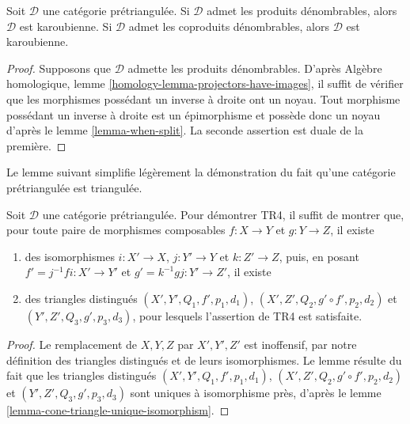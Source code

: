 \begin{lemma}
\label{lemma-projectors-have-images-triangulated}
Soit $\mathcal{D}$ une catégorie prétriangulée.
Si $\mathcal{D}$ admet les produits dénombrables, alors $\mathcal{D}$
est karoubienne.
Si $\mathcal{D}$ admet les coproduits dénombrables, alors $\mathcal{D}$
est karoubienne.
\end{lemma}

\begin{proof}
Supposons que $\mathcal{D}$ admette les produits dénombrables. D'après
Algèbre homologique, lemme \ref{homology-lemma-projectors-have-images},
il suffit de vérifier que les morphismes possédant un inverse à droite ont un
noyau. Tout morphisme possédant un inverse à droite est un épimorphisme et
possède donc un noyau d'après le lemme \ref{lemma-when-split}.
La seconde assertion est duale de la première.
\end{proof}

\noindent
Le lemme suivant simplifie légèrement la démonstration du fait qu'une catégorie
prétriangulée est triangulée.

\begin{lemma}
\label{lemma-easier-axiom-four}
Soit $\mathcal{D}$ une catégorie prétriangulée.
Pour démontrer TR4, il suffit de montrer que, pour toute paire de morphismes
composables $f : X \to Y$ et $g : Y \to Z$, il existe
\begin{enumerate}
\item des isomorphismes $i : X' \to X$, $j : Y' \to Y$ et
$k : Z' \to Z$, puis, en posant $f' = j^{-1}fi : X' \to Y'$ et
$g' = k^{-1}gj : Y' \to Z'$, il existe
\item des triangles distingués
$(X', Y', Q_1, f', p_1, d_1)$,
$(X', Z', Q_2, g' \circ f', p_2, d_2)$
et
$(Y', Z', Q_3, g', p_3, d_3)$,
pour lesquels l'assertion de TR4 est satisfaite.
\end{enumerate}
\end{lemma}

\begin{proof}
Le remplacement de $X, Y, Z$ par $X', Y', Z'$ est inoffensif, par notre
définition des triangles distingués et de leurs isomorphismes.
Le lemme résulte du fait que les triangles distingués
$(X', Y', Q_1, f', p_1, d_1)$,
$(X', Z', Q_2, g' \circ f', p_2, d_2)$
et
$(Y', Z', Q_3, g', p_3, d_3)$
sont uniques à isomorphisme près, d'après le
lemme \ref{lemma-cone-triangle-unique-isomorphism}.
\end{proof}

